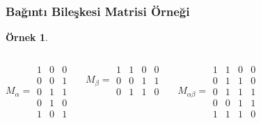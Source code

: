 \documentclass[dvipsnames]{beamer}
\theoremstyle{definition}
\theoremstyle{example}
\newtheorem{ornek}[theorem]{Örnek}
\theoremstyle{plain}
\begin{document}
\begin{frame}
  \frametitle{Bağıntı Bileşkesi Matrisi Örneği}

  \begin{ornek}
    \begin{columns}
      \[
        M_\alpha =
          \begin{array}{|ccc|}
            1 & 0 & 0\\
            0 & 0 & 1\\
            0 & 1 & 1\\
            0 & 1 & 0\\
            1 & 0 & 1
          \end{array}
      \]

      \[
        M_\beta =
          \begin{array}{|cccc|}
            1 & 1 & 0 & 0\\
            0 & 0 & 1 & 1\\
            0 & 1 & 1 & 0
          \end{array}
      \]

      \[
        M_{\alpha \beta} =
          \begin{array}{|cccc|}
            1 & 1 & 0 & 0\\
            0 & 1 & 1 & 0\\
            0 & 1 & 1 & 1\\
            0 & 0 & 1 & 1\\
            1 & 1 & 1 & 0
          \end{array}
      \]
    \end{columns}
  \end{ornek}
\end{frame}
\end{document}
